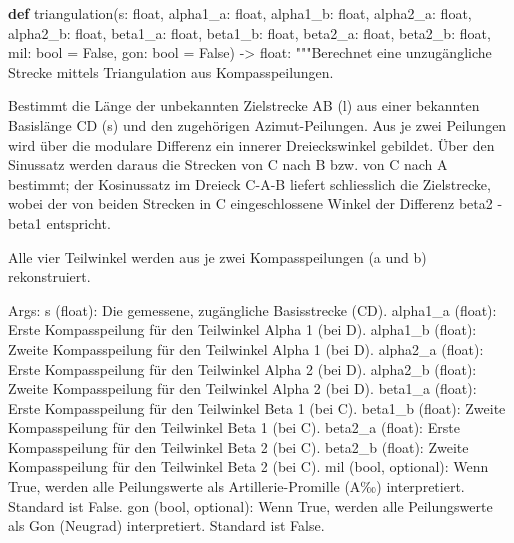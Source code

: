 \documentclass[
  nswissgerman,
  a4paper,
  DIV=11,
  numbers=noendperiod,
  ngerman]{scrreprt}
\newenvironment{Shaded}{\begin{snugshade}}{\end{snugshade}}
\newcommand{\BuiltInTok}[1]{\textcolor[rgb]{0.00,0.23,0.31}{#1}}
\newcommand{\CommentTok}[1]{\textcolor[rgb]{0.37,0.37,0.37}{#1}}
\newcommand{\KeywordTok}[1]{\textcolor[rgb]{0.00,0.23,0.31}{\textbf{#1}}}
\newcommand{\NormalTok}[1]{\textcolor[rgb]{0.00,0.23,0.31}{#1}}
\newcommand{\OperatorTok}[1]{\textcolor[rgb]{0.37,0.37,0.37}{#1}}
\newcommand{\VariableTok}[1]{\textcolor[rgb]{0.07,0.07,0.07}{#1}}
\begin{document}
\begin{Shaded}
\begin{Highlighting}[numbers=left,,]
\KeywordTok{def}\NormalTok{ triangulation(s: }\BuiltInTok{float}\NormalTok{,}
\NormalTok{                  alpha1\_a: }\BuiltInTok{float}\NormalTok{, alpha1\_b: }\BuiltInTok{float}\NormalTok{,}
\NormalTok{                  alpha2\_a: }\BuiltInTok{float}\NormalTok{, alpha2\_b: }\BuiltInTok{float}\NormalTok{,}
\NormalTok{                  beta1\_a: }\BuiltInTok{float}\NormalTok{, beta1\_b: }\BuiltInTok{float}\NormalTok{,}
\NormalTok{                  beta2\_a: }\BuiltInTok{float}\NormalTok{, beta2\_b: }\BuiltInTok{float}\NormalTok{,}
\NormalTok{                  mil: }\BuiltInTok{bool} \OperatorTok{=} \VariableTok{False}\NormalTok{,}
\NormalTok{                  gon: }\BuiltInTok{bool} \OperatorTok{=} \VariableTok{False}\NormalTok{) }\OperatorTok{{-}\textgreater{}} \BuiltInTok{float}\NormalTok{:}
    \CommentTok{"""Berechnet eine unzugängliche Strecke mittels Triangulation aus Kompasspeilungen.}

\CommentTok{    Bestimmt die Länge der unbekannten Zielstrecke AB (l) aus einer bekannten}
\CommentTok{    Basislänge CD (s) und den zugehörigen Azimut{-}Peilungen. Aus je zwei}
\CommentTok{    Peilungen wird über die modulare Differenz ein innerer Dreieckswinkel}
\CommentTok{    gebildet. Über den Sinussatz werden daraus die Strecken von C nach B bzw.}
\CommentTok{    von C nach A bestimmt; der Kosinussatz im Dreieck C{-}A{-}B liefert schliesslich}
\CommentTok{    die Zielstrecke, wobei der von beiden Strecken in C eingeschlossene Winkel}
\CommentTok{    der Differenz beta2 {-} beta1 entspricht.}

\CommentTok{    Alle vier Teilwinkel werden aus je zwei Kompasspeilungen (a und b)}
\CommentTok{    rekonstruiert.}

\CommentTok{    Args:}
\CommentTok{        s (float): Die gemessene, zugängliche Basisstrecke (CD).}
\CommentTok{        alpha1\_a (float): Erste Kompasspeilung für den Teilwinkel Alpha 1 (bei D).}
\CommentTok{        alpha1\_b (float): Zweite Kompasspeilung für den Teilwinkel Alpha 1 (bei D).}
\CommentTok{        alpha2\_a (float): Erste Kompasspeilung für den Teilwinkel Alpha 2 (bei D).}
\CommentTok{        alpha2\_b (float): Zweite Kompasspeilung für den Teilwinkel Alpha 2 (bei D).}
\CommentTok{        beta1\_a (float): Erste Kompasspeilung für den Teilwinkel Beta 1 (bei C).}
\CommentTok{        beta1\_b (float): Zweite Kompasspeilung für den Teilwinkel Beta 1 (bei C).}
\CommentTok{        beta2\_a (float): Erste Kompasspeilung für den Teilwinkel Beta 2 (bei C).}
\CommentTok{        beta2\_b (float): Zweite Kompasspeilung für den Teilwinkel Beta 2 (bei C).}
\CommentTok{        mil (bool, optional): Wenn True, werden alle Peilungswerte als}
\CommentTok{            Artillerie{-}Promille (A‰) interpretiert. Standard ist False.}
\CommentTok{        gon (bool, optional): Wenn True, werden alle Peilungswerte als}
\CommentTok{            Gon (Neugrad) interpretiert. Standard ist False.}


\end{Highlighting}
\end{Shaded}
\end{document}

